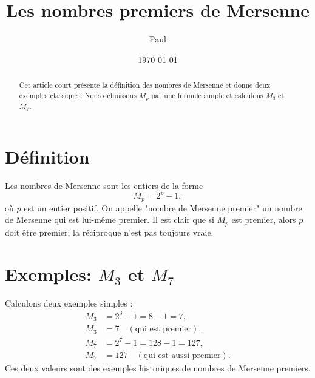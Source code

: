 \documentclass[a4paper,11pt]{article}
\title{Les nombres premiers de Mersenne}
\author{Paul}
\date{\today}
\begin{document}
\maketitle

\begin{abstract}
Cet article court présente la définition des nombres de Mersenne et donne deux exemples classiques. Nous définissons $M_p$ par une formule simple et calculons $M_3$ et $M_7$.
\end{abstract}

\section{D\'efinition}
Les nombres de Mersenne sont les entiers de la forme
\[
M_p = 2^{p} - 1,
\]
o\`u $p$ est un entier positif. On appelle "nombre de Mersenne premier" un nombre de Mersenne qui est lui-m\^eme premier. Il est clair que si $M_p$ est premier, alors $p$ doit \^etre premier; la r\'eciproque n'est pas toujours vraie.

\section{Exemples: $M_3$ et $M_7$}
Calculons deux exemples simples :
\begin{align*}
M_3 &= 2^{3} - 1 = 8 - 1 = 7, \\%
M_3 &= 7 \quad(\text{qui est premier}),
\\
M_7 &= 2^{7} - 1 = 128 - 1 = 127, \\%
M_7 &= 127 \quad(\text{qui est aussi premier}).
\end{align*}
Ces deux valeurs sont des exemples historiques de nombres de Mersenne premiers.
\end{document}
